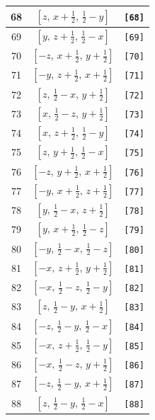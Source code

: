 \documentclass[fleqn,8pt]{jsarticle}
\begin{document}
\begin{longtable}{ccc}
68 & $\left[ z,\, x + \frac{1}{2},\, \frac{1}{2} - y \right]$ & {\tt [68]} \\ \hline
69 & $\left[ y,\, z + \frac{1}{2},\, \frac{1}{2} - x \right]$ & {\tt [69]} \\ \hline
70 & $\left[ - z,\, x + \frac{1}{2},\, y + \frac{1}{2} \right]$ & {\tt [70]} \\ \hline
71 & $\left[ - y,\, z + \frac{1}{2},\, x + \frac{1}{2} \right]$ & {\tt [71]} \\ \hline
72 & $\left[ z,\, \frac{1}{2} - x,\, y + \frac{1}{2} \right]$ & {\tt [72]} \\ \hline
73 & $\left[ x,\, \frac{1}{2} - z,\, y + \frac{1}{2} \right]$ & {\tt [73]} \\ \hline
74 & $\left[ x,\, z + \frac{1}{2},\, \frac{1}{2} - y \right]$ & {\tt [74]} \\ \hline
75 & $\left[ z,\, y + \frac{1}{2},\, \frac{1}{2} - x \right]$ & {\tt [75]} \\ \hline
76 & $\left[ - z,\, y + \frac{1}{2},\, x + \frac{1}{2} \right]$ & {\tt [76]} \\ \hline
77 & $\left[ - y,\, x + \frac{1}{2},\, z + \frac{1}{2} \right]$ & {\tt [77]} \\ \hline
78 & $\left[ y,\, \frac{1}{2} - x,\, z + \frac{1}{2} \right]$ & {\tt [78]} \\ \hline
79 & $\left[ y,\, x + \frac{1}{2},\, \frac{1}{2} - z \right]$ & {\tt [79]} \\ \hline
80 & $\left[ - y,\, \frac{1}{2} - x,\, \frac{1}{2} - z \right]$ & {\tt [80]} \\ \hline
81 & $\left[ - x,\, z + \frac{1}{2},\, y + \frac{1}{2} \right]$ & {\tt [81]} \\ \hline
82 & $\left[ - x,\, \frac{1}{2} - z,\, \frac{1}{2} - y \right]$ & {\tt [82]} \\ \hline
83 & $\left[ z,\, \frac{1}{2} - y,\, x + \frac{1}{2} \right]$ & {\tt [83]} \\ \hline
84 & $\left[ - z,\, \frac{1}{2} - y,\, \frac{1}{2} - x \right]$ & {\tt [84]} \\ \hline
85 & $\left[ - x,\, z + \frac{1}{2},\, \frac{1}{2} - y \right]$ & {\tt [85]} \\ \hline
86 & $\left[ - x,\, \frac{1}{2} - z,\, y + \frac{1}{2} \right]$ & {\tt [86]} \\ \hline
87 & $\left[ - z,\, \frac{1}{2} - y,\, x + \frac{1}{2} \right]$ & {\tt [87]} \\ \hline
88 & $\left[ z,\, \frac{1}{2} - y,\, \frac{1}{2} - x \right]$ & {\tt [88]} \\ \hline

\end{longtable}
\end{document}
